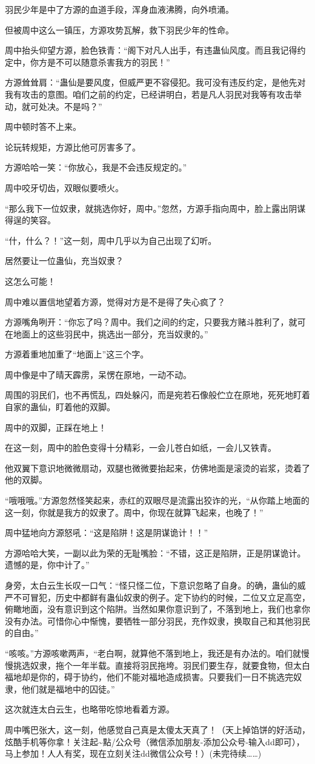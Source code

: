 \begin{this_body}
羽民少年是中了方源的血道手段，浑身血液沸腾，向外喷涌。

但被周中这么一镇压，方源攻势瓦解，救下羽民少年的性命。

周中抬头仰望方源，脸色铁青：“阁下对凡人出手，有违蛊仙风度。而且我记得约定中，你方是不可以随意杀害我方的羽民！”

方源耸耸肩：“蛊仙是要风度，但威严更不容侵犯。我可没有违反约定，是他先对我有攻击的意图。咱们之前的约定，已经讲明白，若是凡人羽民对我等有攻击举动，就可处决。不是吗？”

周中顿时答不上来。

论玩转规矩，方源比他可厉害多了。

方源哈哈一笑：“你放心，我是不会违反规定的。”

周中咬牙切齿，双眼似要喷火。

“那么我下一位奴隶，就挑选你好，周中。”忽然，方源手指向周中，脸上露出阴谋得逞的笑容。

“什，什么？！”这一刻，周中几乎以为自己出现了幻听。

居然要让一位蛊仙，充当奴隶？

这怎么可能！

周中难以置信地望着方源，觉得对方是不是得了失心疯了？

方源嘴角咧开：“你忘了吗？周中。我们之间的约定，只要我方赌斗胜利了，就可在地面上的这些羽民中，挑选出一部分，充当奴隶的。”

方源着重地加重了“地面上”这三个字。

周中像是中了晴天霹雳，呆愣在原地，一动不动。

周围的羽民们，也不再慌乱，四处躲闪，而是宛若石像般伫立在原地，死死地盯着自家的蛊仙，盯着他的双脚。

周中的双脚，正踩在地上！

在这一刻，周中的脸色变得十分精彩，一会儿苍白如纸，一会儿又铁青。

他双翼下意识地微微扇动，双腿也微微要抬起来，仿佛地面是滚烫的岩浆，烫着了他的双脚。

“哦哦哦。”方源忽然怪笑起来，赤红的双眼尽是流露出狡诈的光，“从你踏上地面的这一刻，你就是我方的奴隶了。周中，你现在就算飞起来，也晚了！”

周中猛地向方源怒吼：“这是陷阱！这是阴谋诡计！！”

方源哈哈大笑，一副以此为荣的无耻嘴脸：“不错，这正是陷阱，正是阴谋诡计。遗憾的是，你中计了。”

身旁，太白云生长叹一口气：“怪只怪二位，下意识忽略了自身。的确，蛊仙的威严不可冒犯，历史中都鲜有蛊仙奴隶的例子。定下协约的时候，二位又立足高空，俯瞰地面，没有意识到这个陷阱。当然如果你意识到了，不落到地上，我们也拿你没有办法。可惜你心中惭愧，要牺牲一部分羽民，充作奴隶，换取自己和其他羽民的自由。”

“咳咳。”方源咳嗽两声，“老白啊，就算他不落到地上，我还是有办法的。咱们就慢慢挑选奴隶，拖个一年半载。直接将羽民拖垮。羽民们要生存，就要食物，但太白福地却是你的，碍于协约，他们不能对福地造成损害。只要我们一日不挑选完奴隶，他们就是福地中的囚徒。”

这次就连太白云生，也略带吃惊地看着方源。

周中嘴巴张大，这一刻，他感觉自己真是太傻太天真了！（天上掉馅饼的好活动，炫酷手机等你拿！关注起\~{}點/公众号（微信添加朋友-添加公众号-输入dd即可），马上参加！人人有奖，现在立刻关注dd微信公众号！）(未完待续……)

\end{this_body}

